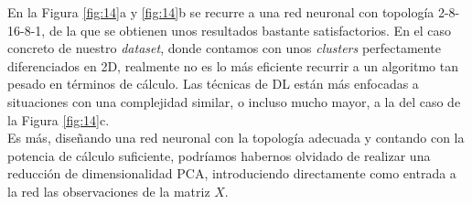 En la Figura \ref{fig:14}a y \ref{fig:14}b se recurre a una red neuronal con topología 2-8-16-8-1, de la que se obtienen unos resultados bastante satisfactorios. En el caso concreto de nuestro \textit{dataset}, donde contamos con unos \textit{clusters} perfectamente diferenciados en 2D, realmente no es lo más eficiente recurrir a un algoritmo tan pesado en términos de cálculo. Las técnicas de DL están más enfocadas a situaciones con una complejidad similar, o incluso mucho mayor, a la del caso de la Figura \ref{fig:14}c.\\

Es más, diseñando una red neuronal con la topología adecuada y contando con la potencia de cálculo suficiente, podríamos habernos olvidado de realizar una reducción de dimensionalidad PCA, introduciendo directamente como entrada a la red las observaciones de la matriz $X$.
